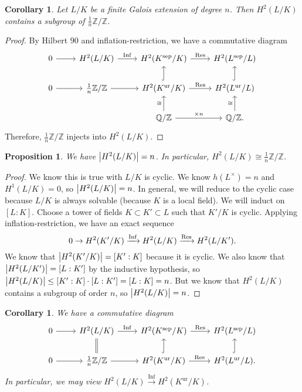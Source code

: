 \documentclass[leqno, openany]{memoir}
\newtheorem{cor}[thm]{Corollary}
\newtheorem{prop}[thm]{Proposition}
\theoremstyle{definition}
\theoremstyle{remark}
\theoremstyle{plain}
\theoremstyle{definition}
\theoremstyle{remark}
\newcommand{\Z}{\mathbb{Z}}
\newcommand{\Q}{\mathbb{Q}}
\newcommand{\mr}[1]{\mathrm{#1}}
\DeclareMathOperator{\Inf}{Inf}
\begin{document}
\begin{cor}
    Let $L/K$ be a finite Galois extension of degree $n$. Then $H^2(L/K)$ contains a subgroup of $\frac{1}{n} \Z/\Z$.
\end{cor}

\begin{proof}
    By Hilbert 90 and inflation-restriction, we have a commutative diagram
    \begin{equation*}
    \begin{tikzcd}
        0 \ar{r} & H^2(L/K) \ar{r}{\Inf} & H^2(K^{\mr{sep}}/K) \ar{r}{\Res} & H^2(L^{\mr{sep}}/L) \\
        0 \ar{r} & \frac{1}{n}\Z/\Z \ar{r} & H^2(K^{\mr{ur}}/K) \ar{r}{\Res} \ar[hookrightarrow]{u} & H^2(L^{\mr{ur}}/L) \ar[hookrightarrow]{u} \\
                 & & \Q/\Z \ar{r}{\times n} \ar{u}{\cong} & \Q/\Z \ar{u}{\cong}.
    \end{tikzcd}
    \end{equation*}
    Therefore, $\frac{1}{n}\Z/\Z$ injects into $H^2(L/K)$.
\end{proof}

\begin{prop}
    We have $\abs{H^2(L/K)} = n$. In particular, $H^2(L/K) \cong \frac{1}{n} \Z/\Z$.
\end{prop}

\begin{proof}
    We know this is true with $L/K$ is cyclic. We know $h(L^{\times}) = n$ and $H^1(L/K) = 0$, so $\abs{H^2(L/K)} = n$. In general, we will reduce to the cyclic case because $L/K$ is always solvable (because $K$ is a local field). We will induct on $[L:K]$. Choose a tower of fields $K \subset K' \subset L$ such that $K'/K$ is cyclic. Applying inflation-restriction, we have an exact sequence
    \[ 0 \to H^2(K'/K) \xrightarrow{\Inf} H^2(L/K) \xrightarrow{\Res} H^2(L/K'). \]
    We know that $\abs{H^2(K'/K)} = [K':K]$ because it is cyclic. We also know that $\abs{H^2(L/K')} = [L:K']$ by the inductive hypothesis, so $\abs{H^2(L/K)} \leq [K':K] \cdot [L:K'] = [L:K] = n$. But we know that $H^2(L/K)$ contains a subgroup of order $n$, so $\abs{H^2(L/K)} = n$.
\end{proof}

\begin{cor}
    We have a commutative diagram
    \begin{equation*}
    \begin{tikzcd}
        0 \ar{r} & H^2(L/K) \ar{r}{\Inf} & H^2(K^{\mr{sep}}/K) \ar{r}{\Res} & H^2(L^{\mr{sep}}/L) \\
        0 \ar{r} & \frac{1}{n}\Z/\Z \ar[equal]{u} \ar{r} & H^2(K^{\mr{ur}}/K) \ar{r}{\Res} \ar[hookrightarrow]{u} & H^2(L^{\mr{ur}}/L). \ar[hookrightarrow]{u} 
    \end{tikzcd}
    \end{equation*}
    In particular, we may view $H^2(L/K) \xrightarrow{\Inf} H^2(K^{\mr{ur}}/K)$.
\end{cor}
\end{document}
